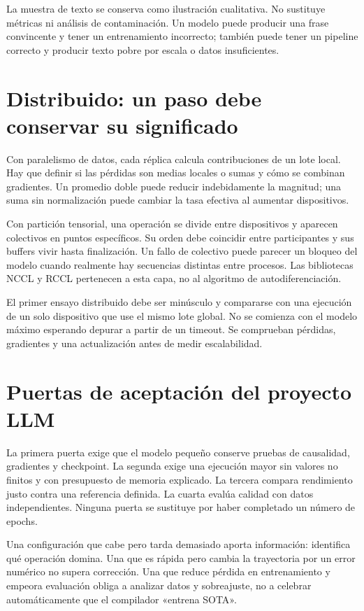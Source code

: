 \documentclass[12pt,a4paper,oneside]{report}
\begin{document}
La muestra de texto se conserva como ilustración cualitativa. No sustituye métricas ni análisis de contaminación. Un modelo puede producir una frase convincente y tener un entrenamiento incorrecto; también puede tener un pipeline correcto y producir texto pobre por escala o datos insuficientes.

\section{Distribuido: un paso debe conservar su significado}
Con paralelismo de datos, cada réplica calcula contribuciones de un lote local. Hay que definir si las pérdidas son medias locales o sumas y cómo se combinan gradientes. Un promedio doble puede reducir indebidamente la magnitud; una suma sin normalización puede cambiar la tasa efectiva al aumentar dispositivos.

Con partición tensorial, una operación se divide entre dispositivos y aparecen colectivos en puntos específicos. Su orden debe coincidir entre participantes y sus buffers vivir hasta finalización. Un fallo de colectivo puede parecer un bloqueo del modelo cuando realmente hay secuencias distintas entre procesos. Las bibliotecas NCCL y RCCL pertenecen a esta capa, no al algoritmo de autodiferenciación. \cite{nccl,rccl}

El primer ensayo distribuido debe ser minúsculo y compararse con una ejecución de un solo dispositivo que use el mismo lote global. No se comienza con el modelo máximo esperando depurar a partir de un timeout. Se comprueban pérdidas, gradientes y una actualización antes de medir escalabilidad.

\section{Puertas de aceptación del proyecto LLM}
La primera puerta exige que el modelo pequeño conserve pruebas de causalidad, gradientes y checkpoint. La segunda exige una ejecución mayor sin valores no finitos y con presupuesto de memoria explicado. La tercera compara rendimiento justo contra una referencia definida. La cuarta evalúa calidad con datos independientes. Ninguna puerta se sustituye por haber completado un número de epochs.

Una configuración que cabe pero tarda demasiado aporta información: identifica qué operación domina. Una que es rápida pero cambia la trayectoria por un error numérico no supera corrección. Una que reduce pérdida en entrenamiento y empeora evaluación obliga a analizar datos y sobreajuste, no a celebrar automáticamente que el compilador «entrena SOTA».
\end{document}
